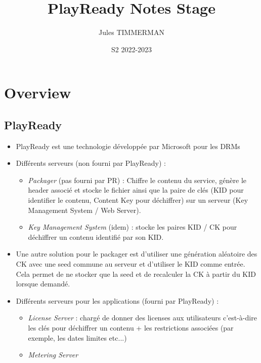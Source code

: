 \documentclass[french]{article}
\title{PlayReady Notes Stage}
\author{Jules TIMMERMAN}
\date{S2 2022-2023}
\begin{document}
\maketitle


\section{Overview}

\subsection{PlayReady}

\begin{itemize}
	
	\item PlayReady est une technologie développée par Microsoft pour les DRMs
	
	\item Différents serveurs (non fourni par PlayReady) : 
	\begin{itemize}
		\item \emph{Packager} (pas fourni par PR) : Chiffre le contenu du service, génère le header associé et stocke le fichier ainsi que la paire de clés (KID pour identifier le contenu, Content Key pour déchiffrer) sur un serveur (Key Management System / Web Server).
		
		\item \emph{Key Management System} (idem) : stocke les paires KID / CK pour déchiffrer un contenu identifié par son KID.
		
	\end{itemize}
	
	\item Une autre solution pour le packager est d'utiliser une génération aléatoire des CK avec une seed commune au serveur et d'utiliser le KID comme entrée. Cela permet de ne stocker que la seed et de recalculer la CK à partir du KID lorsque demandé.
	
	\item Différents serveurs pour les applications (fourni par PlayReady) : 
	
	
	\begin{itemize}
		\item \emph{License Server} : chargé de donner des licenses aux utilisateurs c'est-à-dire les clés pour déchiffrer un contenu + les restrictions associées (par exemple, les dates limites etc...)
		
		\item \emph{Metering Server}
		

\end{itemize}
\end{itemize}
\end{document}
